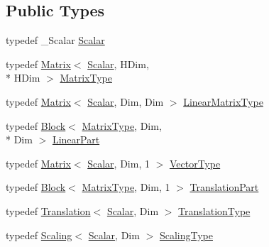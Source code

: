 \subsection*{Public Types}
\begin{DoxyCompactItemize}
\item 
typedef \-\_\-\-Scalar \hyperlink{class_transform_a0468fefb805493a70f2100c7faf05489}{Scalar}
\item 
typedef \hyperlink{class_matrix}{Matrix}$<$ \hyperlink{class_transform_a0468fefb805493a70f2100c7faf05489}{Scalar}, H\-Dim, \\*
H\-Dim $>$ \hyperlink{class_transform_afcdb9f1ab6b63ddfbc52789ef6319f33}{Matrix\-Type}
\item 
typedef \hyperlink{class_matrix}{Matrix}$<$ \hyperlink{class_transform_a0468fefb805493a70f2100c7faf05489}{Scalar}, Dim, Dim $>$ \hyperlink{class_transform_ac41e348fcbe528edca0c5e8b1954ba87}{Linear\-Matrix\-Type}
\item 
typedef \hyperlink{class_block}{Block}$<$ \hyperlink{class_transform_afcdb9f1ab6b63ddfbc52789ef6319f33}{Matrix\-Type}, Dim, \\*
Dim $>$ \hyperlink{class_transform_adb8a1fb72e2dcea3ffc41f85e81552b6}{Linear\-Part}
\item 
typedef \hyperlink{class_matrix}{Matrix}$<$ \hyperlink{class_transform_a0468fefb805493a70f2100c7faf05489}{Scalar}, Dim, 1 $>$ \hyperlink{class_transform_a7f3fffa604cd96e5dfe3ed2b947f575f}{Vector\-Type}
\item 
typedef \hyperlink{class_block}{Block}$<$ \hyperlink{class_transform_afcdb9f1ab6b63ddfbc52789ef6319f33}{Matrix\-Type}, Dim, 1 $>$ \hyperlink{class_transform_a00ccb56dcd1ca99fb61b87fa229f0440}{Translation\-Part}
\item 
typedef \hyperlink{class_translation}{Translation}$<$ \hyperlink{class_transform_a0468fefb805493a70f2100c7faf05489}{Scalar}, Dim $>$ \hyperlink{class_transform_adc0ae33868e7f2d468acc92d2d4c4b80}{Translation\-Type}
\item 
typedef \hyperlink{class_scaling}{Scaling}$<$ \hyperlink{class_transform_a0468fefb805493a70f2100c7faf05489}{Scalar}, Dim $>$ \hyperlink{class_transform_a4b7ae3ae58b92b27215b3eed30fde503}{Scaling\-Type}
\end{DoxyCompactItemize}
